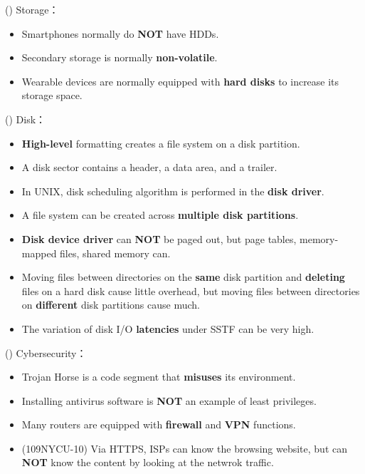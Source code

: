 \begin{theorem}{()} Storage： \begin{itemize}
        \item Smartphones normally do \textbf{NOT} have HDDs.
        \item Secondary storage is normally \textbf{non-volatile}.
        \item Wearable devices are normally equipped with \textbf{hard disks} to increase its storage space.
    \end{itemize}
\end{theorem}

\begin{theorem}{()} Disk： \begin{itemize}
        \item \textbf{High-level} formatting creates a file system on a disk partition.
        \item A disk sector contains a header, a data area, and a trailer.
        \item In UNIX, disk scheduling algorithm is performed in the \textbf{disk driver}.
        \item A file system can be created across \textbf{multiple disk partitions}.
        \item \textbf{Disk device driver} can \textbf{NOT} be paged out, but page tables, memory-mapped files, shared memory can.
        \item Moving files between directories on the \textbf{same} disk partition and \textbf{deleting} files on a hard disk cause little overhead, but moving files between directories on \textbf{different} disk partitions cause much.
        \item The variation of disk I/O \textbf{latencies} under SSTF can be very high.
    \end{itemize}
\end{theorem}

\begin{theorem}{()} Cybersecurity： \begin{itemize}
        \item Trojan Horse is a code segment that \textbf{misuses} its environment.
        \item Installing antivirus software is \textbf{NOT} an example of least privileges.
        \item Many routers are equipped with \textbf{firewall} and \textbf{VPN} functions.
        \item (109NYCU-10) Via HTTPS, ISPs can know the browsing website, but can \textbf{NOT} know the content by looking at the netwrok traffic.
    \end{itemize}
\end{theorem}

